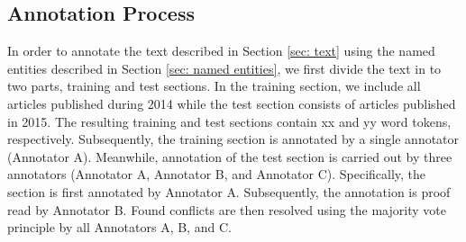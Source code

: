 \documentclass[11pt]{article}
\begin{document}







\subsection{Annotation Process}

In order to annotate the text described in Section \ref{sec: text} using the named entities described in Section \ref{sec: named entities}, we first divide the text in to two parts, training and test sections. In the training section, we include all articles published during 2014 while the test section consists of articles published in 2015. The resulting training and test sections contain xx and yy word tokens, respectively. Subsequently, the training section is annotated by a single annotator (Annotator A). Meanwhile, annotation of the test section is carried out by three annotators (Annotator A, Annotator B, and Annotator C). Specifically, the section is first annotated by Annotator A. Subsequently, the annotation is proof read by Annotator B. Found conflicts are then resolved using the majority vote principle by all Annotators A, B, and C.
\end{document}
